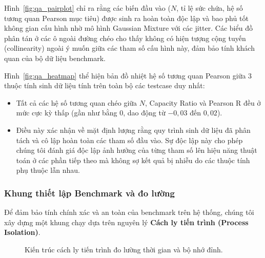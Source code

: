 \documentclass[fontsize=13pt,a4paper]{report}
\begin{document}
Hình~\ref{fig:qa_pairplot} chỉ ra rằng các biến đầu vào ($N$, tỉ lệ sức chứa, hệ số tương quan Pearson mục tiêu) được sinh ra hoàn toàn độc lập và bao phủ tốt không gian cấu hình nhờ mô hình Gaussian Mixture với các jitter. Các biểu đồ phân tán ở các ô ngoài đường chéo cho thấy không có hiện tượng cộng tuyến (collinearity) ngoài ý muốn giữa các tham số cấu hình này, đảm bảo tính khách quan của bộ dữ liệu benchmark.

Hình~\ref{fig:qa_heatmap} thể hiện bản đồ nhiệt hệ số tương quan Pearson giữa 3 thuộc tính sinh dữ liệu tính trên toàn bộ các testcase duy nhất:
\begin{itemize}[leftmargin=*]
    \item Tất cả các hệ số tương quan chéo giữa $N$, Capacity Ratio và Pearson R đều ở mức cực kỳ thấp (gần như bằng 0, dao động từ $-0,03$ đến $0,02$).
    \item Điều này xác nhận về mặt định lượng rằng quy trình sinh dữ liệu đã phân tách và cô lập hoàn toàn các tham số đầu vào. Sự độc lập này cho phép chúng tôi đánh giá độc lập ảnh hưởng của từng tham số lên hiệu năng thuật toán ở các phần tiếp theo mà không sợ kết quả bị nhiễu do các thuộc tính phụ thuộc lẫn nhau.
\end{itemize}

\FloatBarrier
\subsubsection{Khung thiết lập Benchmark và đo lường}
\label{subsubsec:benchmark_setup}

Để đảm bảo tính chính xác và an toàn của benchmark trên hệ thống, chúng tôi xây dựng một khung chạy dựa trên nguyên lý \textbf{Cách ly tiến trình (Process Isolation)}.

\begin{figure}[H]
    \centering
    \caption{Kiến trúc cách ly tiến trình đo lường thời gian và bộ nhớ đỉnh.}
    \label{fig:bench_arch}
\end{figure}
\end{document}
